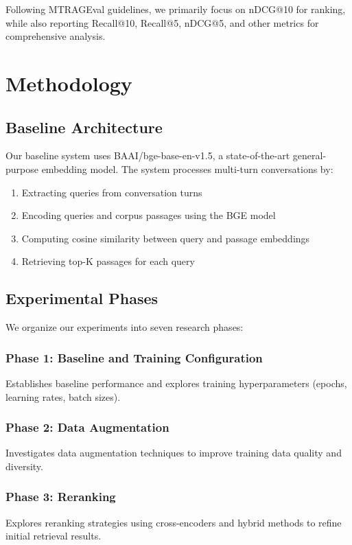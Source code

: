 \documentclass[11pt]{article}
\begin{document}
Following MTRAGEval guidelines, we primarily focus on nDCG@10 for ranking, while also reporting Recall@10, Recall@5, nDCG@5, and other metrics for comprehensive analysis.

\section{Methodology}

\subsection{Baseline Architecture}

Our baseline system uses BAAI/bge-base-en-v1.5, a state-of-the-art general-purpose embedding model. The system processes multi-turn conversations by:
\begin{enumerate}
    \item Extracting queries from conversation turns
    \item Encoding queries and corpus passages using the BGE model
    \item Computing cosine similarity between query and passage embeddings
    \item Retrieving top-K passages for each query
\end{enumerate}

\subsection{Experimental Phases}

We organize our experiments into seven research phases:

\subsubsection{Phase 1: Baseline and Training Configuration}
Establishes baseline performance and explores training hyperparameters (epochs, learning rates, batch sizes).

\subsubsection{Phase 2: Data Augmentation}
Investigates data augmentation techniques to improve training data quality and diversity.

\subsubsection{Phase 3: Reranking}
Explores reranking strategies using cross-encoders and hybrid methods to refine initial retrieval results.
\end{document}
